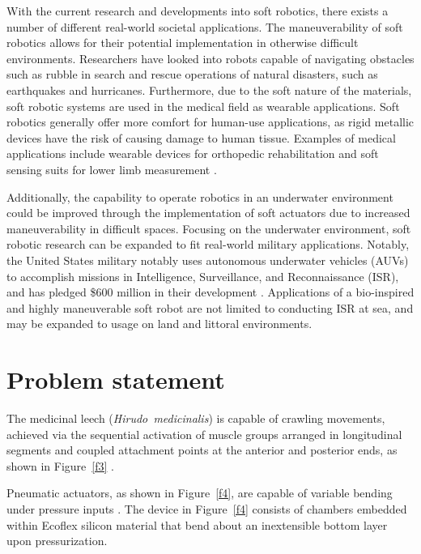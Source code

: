 \documentclass{IEEEtran}
\newcommand{\Gensp}[1]{\emph{#1}}
\newcommand{\Hirudomedicinalis}{\Gensp{Hirudo~medicinalis}}
\begin{document}
With the current research and developments into soft robotics, there exists a number of different real-world societal applications. The maneuverability of soft robotics allows for their potential implementation in otherwise difficult environments.  Researchers have looked into robots capable of navigating obstacles such as rubble in search and rescue operations of natural disasters, such as earthquakes and hurricanes\cite{irv2017xxx}.  Furthermore, due to the soft nature of the materials, soft robotic systems are used in the medical field as wearable applications.  Soft robotics generally offer more comfort for human-use applications, as rigid metallic devices have the risk of causing damage to human tissue.  Examples of medical applications include wearable devices for orthopedic rehabilitation \cite{par2014xxx} and soft sensing suits for lower limb measurement \cite{men2014xxx}.

Additionally, the capability to operate robotics in an underwater environment could be improved through the implementation of soft actuators due to increased maneuverability in difficult spaces.  Focusing on the underwater environment, soft robotic research can be expanded to fit real-world military applications.  Notably, the United States military notably uses autonomous underwater vehicles (AUVs) to accomplish missions in Intelligence, Surveillance, and Reconnaissance (ISR), and has pledged \$600 million in their development \cite{pomerleau2016dod}.  Applications of a bio-inspired and highly maneuverable soft robot are not limited to conducting ISR at sea, and may be expanded to usage on land and littoral environments.

\section{Problem statement}
The medicinal leech (\Hirudomedicinalis) is capable of crawling movements, achieved via the sequential activation of muscle groups arranged in longitudinal segments and coupled attachment points at the anterior and posterior ends, as shown in Figure~\ref{f3} \cite{kristan2005neuronal}.  

Pneumatic actuators, as shown in Figure~\ref{f4}, are capable of variable bending under pressure inputs \cite{polygerinos2015modeling}.  The device in Figure~\ref{f4} consists of chambers embedded within Ecoflex silicon material that bend about an inextensible bottom layer upon pressurization.  
\end{document}
